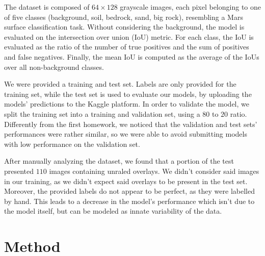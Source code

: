 \documentclass[11pt]{article}
\begin{document}
\begin{multicols}{2}

      The dataset is composed of $64\times128$ grayscale images, each pixel belonging to one of five classes (background, soil, bedrock, sand, big rock), resembling a Mars surface classification task\cite{li2024marssegmarssurfacesemantic}. Without considering the background, the model is evaluated on the intersection over union (IoU) metric. For each class, the IoU is evaluated as the ratio of the number of true positives and the sum of positives and false negatives. Finally, the mean IoU is computed as the average of the IoUs over all non-background classes.

      We were provided a training and test set. Labels are only provided for the training set, while the test set is used to evaluate our models, by uploading the models' predictions to the Kaggle\cite{kaggle} platform. In order to validate the model, we split the training set into a training and validation set, using a $80$ to $20$ ratio. Differently from the first homework, we noticed that the validation and test sets' performances were rather similar, so we were able to avoid submitting models with low performance on the validation set.

      After manually analyzing the dataset, we found that a portion of the test presented $110$ images containing unraled overlays. We didn't consider said images in our training, as we didn't expect said overlays to be present in the test set. Moreover, the provided labels do not appear to be perfect, as they were labelled by hand. This leads to a decrease in the model's performance which isn't due to the model itself, but can be modeled as innate variability of the data.

      \section{Method}


\end{multicols}
\end{document}
